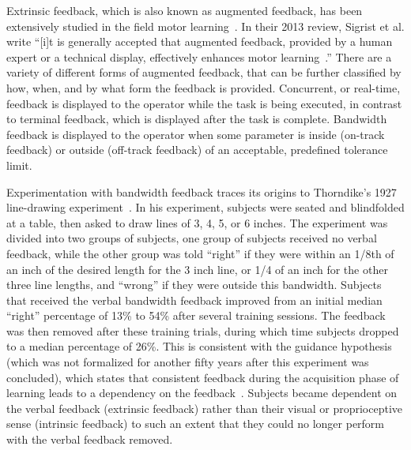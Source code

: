 Extrinsic feedback, which is also known as augmented feedback, has been extensively studied in the field motor learning~\citep{sigrist_augmented_2013}.
In their 2013 review, Sigrist et al. write ``[i]t is generally accepted that augmented feedback, provided by a human expert or a technical display, effectively enhances motor learning~\citep{sigrist_augmented_2013}.''
There are a variety of different forms of augmented feedback, that can be further classified by how, when, and by what form the feedback is provided.
Concurrent, or real-time, feedback is displayed to the operator while the task is being executed, in contrast to terminal feedback, which is displayed after the task is complete.
Bandwidth feedback is displayed to the operator when some parameter is inside (on-track feedback) or outside (off-track feedback) of an acceptable, predefined tolerance limit.

Experimentation with bandwidth feedback traces its origins to Thorndike's 1927 line-drawing experiment~\citep{thorndike_law_1927}.
In his experiment, subjects were seated and blindfolded at a table, then asked to draw lines of 3, 4, 5, or 6 inches.
The experiment was divided into two groups of subjects, one group of subjects received no verbal feedback, while the other group was told ``right'' if they were within an 1/8th of an inch of the desired length for the 3 inch line, or 1/4 of an inch for the other three line lengths, and ``wrong'' if they were outside this bandwidth.
Subjects that received the verbal bandwidth feedback improved from an initial median ``right'' percentage of 13\% to 54\% after several training sessions.
The feedback was then removed after these training trials, during which time subjects dropped to a median percentage of 26\%.
This is consistent with the guidance hypothesis (which was not formalized for another fifty years after this experiment was concluded), which states that consistent feedback during the acquisition phase of learning leads to a dependency on the feedback~\citep{salmoni_knowledge_1984}.
Subjects became dependent on the verbal feedback (extrinsic feedback) rather than their visual or proprioceptive sense (intrinsic feedback) to such an extent that they could no longer perform with the verbal feedback removed.

